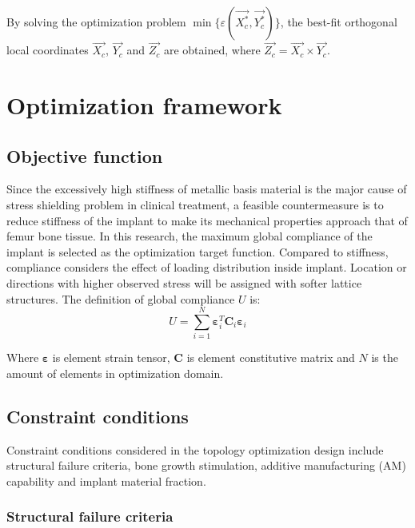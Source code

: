 \documentclass[12pt]{extbook}
\begin{document}
By solving the optimization problem $\min\{\varepsilon(\overrightarrow{X^*_c}, \overrightarrow{Y^*_c})\}$, the best-fit orthogonal local coordinates $\overrightarrow{X_c}$, $\overrightarrow{Y_c}$ and $\overrightarrow{Z_c}$ are obtained, where $\overrightarrow{Z_c} = \overrightarrow{X_c} \times \overrightarrow{Y_c}$.\\

\section{Optimization framework}
\label{femur_opti}

\subsection{Objective function}
\label{femur_opti_obje}

Since the excessively high stiffness of metallic basis material is the major cause of stress shielding problem in clinical treatment, a feasible countermeasure is to reduce stiffness of the implant to make its mechanical properties approach that of femur bone tissue. In this research, the maximum global compliance of the implant is selected as the optimization target function. Compared to stiffness, compliance considers the effect of loading distribution inside implant. Location or directions with higher observed stress will be assigned with softer lattice structures. The definition of global compliance $U$ is:
\begin{equation}
U = \sum_{i=1}^N \bm{\varepsilon}_i^T\bm{C}_i\bm{\varepsilon}_i
\label{3-2-1}
\end{equation}

Where $\bm{\varepsilon}$ is element strain tensor, $\bm{C}$ is element constitutive matrix and $N$ is the amount of elements in optimization domain.\\

\subsection{Constraint conditions}
\label{femur_opti_cons}

Constraint conditions considered in the topology optimization design include structural failure criteria, bone growth stimulation, additive manufacturing (AM) capability and implant material fraction.\\

\subsubsection{Structural failure criteria}
\end{document}
